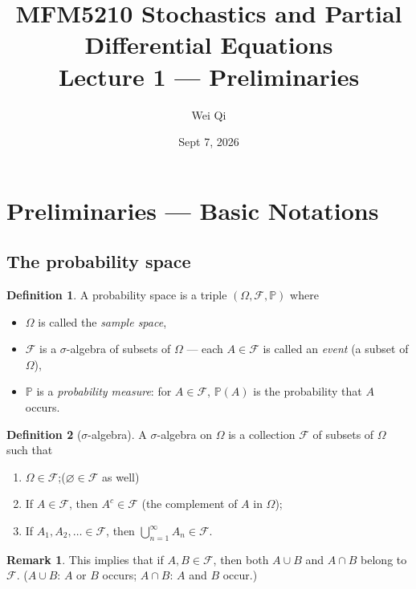 \documentclass[11pt]{article}
\title{\textbf{MFM5210 Stochastics and Partial Differential Equations}\\[4pt]
\large Lecture 1 --- Preliminaries}
\author{Wei Qi}
\date{Sept 7, 2026}
\let\emptyset\varnothing
\newcommand{\Prob}{\mathbb{P}}
\theoremstyle{definition}
\newtheorem{definition}{Definition}[section]
\newtheorem{remark}{Remark}[section]
\begin{document}
\maketitle

\setcounter{section}{0}

\section{Preliminaries --- Basic Notations}

\subsection*{The probability space}

\begin{definition}
A probability space is a triple $(\Omega,\mathcal{F},\Prob)$ where
\begin{itemize}
  \item $\Omega$ is called the \emph{sample space},
  \item $\mathcal{F}$ is a $\sigma$-algebra of subsets of $\Omega$ --- each
        $A \in \mathcal{F}$ is called an \emph{event} (a subset of $\Omega$),
  \item $\Prob$ is a \emph{probability measure}: for $A \in \mathcal{F}$,
        $\Prob(A)$ is the probability that $A$ occurs.
\end{itemize}
\end{definition}

\begin{definition}[$\sigma$-algebra]
A $\sigma$-algebra on $\Omega$ is a collection $\mathcal{F}$ of subsets of
$\Omega$ such that
\begin{enumerate}
  \item[(i)] $\Omega \in \mathcal{F}$;\qquad ($\emptyset \in \mathcal{F}$ as well)
  \item[(ii)] If $A \in \mathcal{F}$, then $A^c \in \mathcal{F}$
        (the complement of $A$ in $\Omega$);
  \item[(iii)] If $A_1, A_2, \dots \in \mathcal{F}$, then
        $\displaystyle \bigcup_{n=1}^{\infty} A_n \in \mathcal{F}$.
\end{enumerate}
\end{definition}

\begin{remark}
This implies that if $A,B \in \mathcal{F}$, then both $A \cup B$ and $A \cap B$
belong to $\mathcal{F}$.\;\;
($A \cup B$: $A$ or $B$ occurs; \; $A \cap B$: $A$ and $B$ occur.)
\end{remark}
\end{document}
